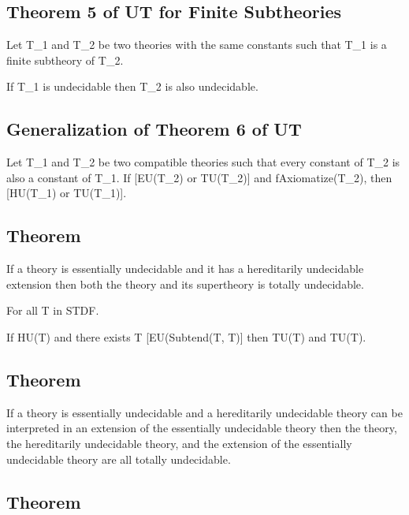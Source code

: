 \hypertarget{theorem-5-of-ut-for-finite-subtheories}{%
\subsection{Theorem 5 of UT for Finite
Subtheories}\label{theorem-5-of-ut-for-finite-subtheories}}

Let T\_1 and T\_2 be two theories with the same constants such that T\_1
is a finite subtheory of T\_2.

If T\_1 is undecidable then T\_2 is also undecidable.

\hypertarget{generalization-of-theorem-6-of-ut}{%
\subsection{Generalization of Theorem 6 of
UT}\label{generalization-of-theorem-6-of-ut}}

Let T\_1 and T\_2 be two compatible theories such that every constant of
T\_2 is also a constant of T\_1. If {[}EU(T\_2) or TU(T\_2){]} and
fAxiomatize(T\_2), then {[}HU(T\_1) or TU(T\_1){]}.

\hypertarget{theorem}{%
\subsection{Theorem}\label{theorem}}

If a theory is essentially undecidable and it has a hereditarily
undecidable extension then both the theory and its supertheory is
totally undecidable.

For all T in STDF.

If HU(T) and there exists T\textquotesingle{} {[}EU(Subtend(T,
T\textquotesingle){]} then TU(T) and TU(T\textquotesingle).

\hypertarget{theorem-1}{%
\subsection{Theorem}\label{theorem-1}}

If a theory is essentially undecidable and a hereditarily undecidable
theory can be interpreted in an extension of the essentially undecidable
theory then the theory, the hereditarily undecidable theory, and the
extension of the essentially undecidable theory are all totally
undecidable.

\hypertarget{theorem-2}{%
\subsection{Theorem}\label{theorem-2}}

